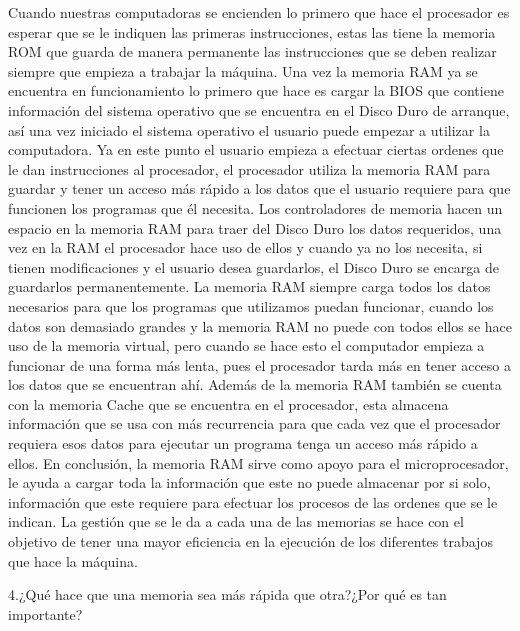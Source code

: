 \documentclass{article}
\begin{document}
Cuando nuestras computadoras se encienden lo primero que hace el procesador es esperar que se le indiquen las primeras instrucciones, estas las tiene la memoria ROM que guarda de manera permanente las instrucciones que se deben realizar siempre que empieza a trabajar la máquina. Una vez la memoria RAM ya se encuentra en funcionamiento lo primero que hace es cargar la BIOS que contiene información del sistema operativo que se encuentra en el Disco Duro de arranque, así una vez iniciado el sistema operativo el usuario puede empezar a utilizar la computadora. Ya en este punto el usuario empieza a efectuar ciertas ordenes que le dan instrucciones al procesador, el procesador utiliza la memoria RAM para guardar y tener un acceso más rápido a los datos que el usuario requiere para que funcionen los programas que él necesita. Los controladores de memoria hacen un espacio en la memoria RAM para traer del Disco Duro los datos requeridos, una vez en la RAM el procesador hace uso de ellos y cuando ya no los necesita, si tienen modificaciones y el usuario desea guardarlos, el Disco Duro se encarga de guardarlos permanentemente. La memoria RAM siempre carga todos los datos necesarios para que los programas que utilizamos puedan funcionar, cuando los datos son demasiado grandes y la memoria RAM no puede con todos ellos se hace uso de la memoria virtual, pero cuando se hace esto el computador empieza a funcionar de una forma más lenta, pues el procesador tarda más en tener acceso a los datos que se encuentran ahí. Además de la memoria RAM también se cuenta con la memoria Cache que se encuentra en el procesador, esta almacena información que se usa con más recurrencia para que cada vez que el procesador requiera esos datos para ejecutar un programa tenga un acceso más rápido a ellos. En conclusión, la memoria RAM sirve como apoyo para el microprocesador, le ayuda a cargar toda la información que este no puede almacenar por si solo, información que este requiere para efectuar los procesos de las ordenes que se le indican.  La gestión que se le da a cada una de las memorias se hace con el objetivo de tener una mayor eficiencia en la ejecución de los diferentes trabajos que hace la máquina.\cite{YouBioit}


4.¿Qué hace que una memoria sea más rápida que otra?¿Por qué es tan importante?
\end{document}
